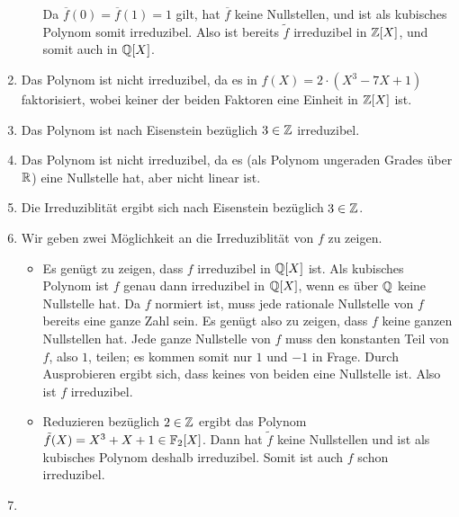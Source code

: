 \begin{solution}
\begin{enumerate}
\begin{itemize}
          Da $\overline{f}(0) = \overline{f}(1) = 1$ gilt, hat $\overline{f}$ keine Nullstellen, und ist als kubisches Polynom somit irreduzibel.
          Also ist bereits $\tilde{f}$ irreduzibel in $\mathbb{Z}[X]$, und somit auch in $\mathbb{Q}[X]$.
      \end{itemize}
    \item
      Das Polynom ist nicht irreduzibel, da es in $f(X) = 2 \cdot (X^3 - 7X + 1)$ faktorisiert, wobei keiner der beiden Faktoren eine Einheit in $\mathbb{Z}[X]$ ist.
    \item
      Das Polynom ist nach Eisenstein bezüglich $3 \in \mathbb{Z}$ irreduzibel.
    \item
      Das Polynom ist nicht irreduzibel, da es (als Polynom ungeraden Grades über $\mathbb{R}$) eine Nullstelle hat, aber nicht linear ist.
    \item
      Die Irreduziblität ergibt sich nach Eisenstein bezüglich $3 \in \mathbb{Z}$.
    \item
      Wir geben zwei Möglichkeit an die Irreduziblität von $f$ zu zeigen.
      \begin{itemize}
        \item
          Es genügt zu zeigen, dass $f$ irreduzibel in $\mathbb{Q}[X]$ ist.
          Als kubisches Polynom ist $f$ genau dann irreduzibel in $\mathbb{Q}[X]$, wenn es über $\mathbb{Q}$ keine Nullstelle hat.
          Da $f$ normiert ist, muss jede rationale Nullstelle von $f$ bereits eine ganze Zahl sein.
          Es genügt also zu zeigen, dass $f$ keine ganzen Nullstellen hat.
          Jede ganze Nullstelle von $f$ muss den konstanten Teil von $f$, also $1$, teilen;
          es kommen somit nur $1$ und $-1$ in Frage.
          Durch Ausprobieren ergibt sich, dass keines von beiden eine Nullstelle ist.
          Also ist $f$ irreduzibel.
        \item
          Reduzieren bezüglich $2 \in \mathbb{Z}$ ergibt das Polynom $\tilde{f}(X) = X^3 + X + 1 \in \mathbb{F}_2[X]$.
          Dann hat $\tilde{f}$ keine Nullstellen und ist als kubisches Polynom deshalb irreduzibel.
          Somit ist auch $f$ schon irreduzibel.
      \end{itemize}
    \item

\end{enumerate}
\end{solution}
